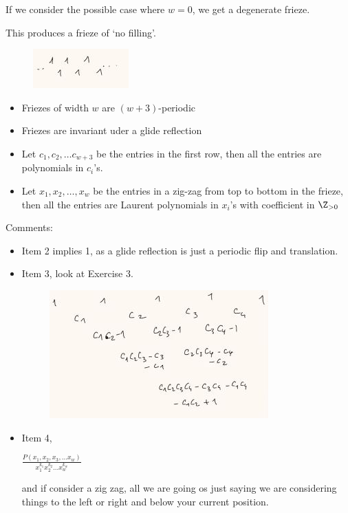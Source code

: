 \documentclass{article}
\begin{document}
If we consider the possible case where $w = 0$, we get a degenerate frieze.

\begin{eg}
  This produces a frieze of `no filling'.
  \begin{figure}[!ht]
    \centering
    \includegraphics{./figures/L2.3}
  \end{figure}
\end{eg}

\begin{nthm}[Thm 1]
  \begin{itemize}
    \item Friezes of width $w$ are $(w + 3)$-periodic
    \item Friezes are invariant uder a glide reflection
    \item Let $c_1, c_2, \dots c_{w+3}$ be the entries in the first row, then all the entries are polynomials in $c_i$'s.
    \item Let $x_1, x_2,\dots, x_w$ be the entries in a zig-zag from top to bottom in the frieze, then all the entries are Laurent polynomials in $x_i$'s with coefficient in $\Z_{>0}$
  \end{itemize}
\end{nthm}

Comments:
\begin{itemize}
  \item Item 2 implies 1, as a glide reflection is just a periodic flip and translation.
  \item Item 3, look at Exercise 3.
  \begin{figure}[!ht]
    \centering
    \includegraphics{./figures/L2.4}
  \end{figure}
  \item Item 4,
  \begin{ndefi}
    $\frac{P(x_1, x_2, x_3, \dots x_w)}{x_1^{k_1}x_2^{k_2}\dots x_w^{k_w}}$
  \end{ndefi}
  and if consider a zig zag, all we are going os just saying we are considering things to the left or right and below your current position.
\end{itemize}
\end{document}
